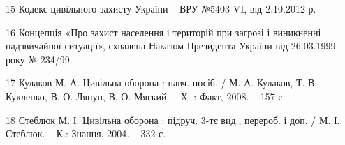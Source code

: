15 Кодекс цивільного захисту України – ВРУ №5403-VI, від 2.10.2012 р.

16 Концепція «Про захист населення і територій при загрозі і виникненні надзвичайної ситуації», схвалена Наказом Президента України від 26.03.1999 року № 234/99.

17 Кулаков М. А. Цивільна оборона : навч. посіб. / М. А. Кулаков, Т. В. Кукленко, В. О. Ляпун, В. О. Мягкий. – Х. : Факт, 2008. – 157 с.

18 Стеблюк М. І. Цивільна оборона  : підруч. 3-тє вид., перероб. і доп. / М. І. Стеблюк. – К.: Знання, 2004. – 332 с.
